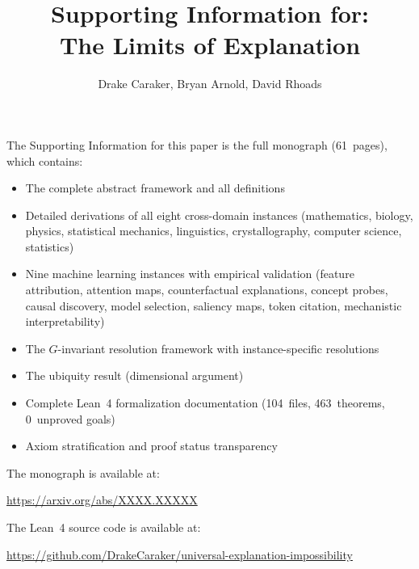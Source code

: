 \documentclass[11pt]{article}
\title{\Large\textbf{Supporting Information for:\\[4pt]
  The Limits of Explanation}}
\author{%
  Drake Caraker, Bryan Arnold, David Rhoads
}
\date{}
\begin{document}
\maketitle
\thispagestyle{empty}

\vspace{2cm}

\noindent
The Supporting Information for this paper is the full monograph (61~pages),
which contains:

\begin{itemize}
  \item The complete abstract framework and all definitions
  \item Detailed derivations of all eight cross-domain instances
    (mathematics, biology, physics, statistical mechanics, linguistics,
    crystallography, computer science, statistics)
  \item Nine machine learning instances with empirical validation
    (feature attribution, attention maps, counterfactual explanations,
    concept probes, causal discovery, model selection, saliency maps,
    token citation, mechanistic interpretability)
  \item The $G$-invariant resolution framework with instance-specific resolutions
  \item The ubiquity result (dimensional argument)
  \item Complete Lean~4 formalization documentation
    (104~files, 463~theorems, 0~unproved goals)
  \item Axiom stratification and proof status transparency
\end{itemize}

\vspace{1cm}

\noindent
The monograph is available at:

\begin{center}
  \url{https://arxiv.org/abs/XXXX.XXXXX}
\end{center}

\vspace{0.5cm}

\noindent
The Lean~4 source code is available at:

\begin{center}
  \url{https://github.com/DrakeCaraker/universal-explanation-impossibility}
\end{center}
\end{document}
